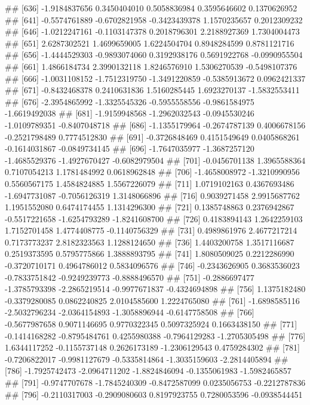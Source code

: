 \documentclass[
]{article}
\begin{document}
\begin{enumerate}[label=(\alph*)]
##  [636] -1.9184837656  0.3450404010  0.5058836984  0.3595646602  0.1370626952
##  [641] -0.5574761889 -0.6702821958 -0.3423439378  1.1570235657  0.2012309232
##  [646] -1.0212247161 -0.1103147378  0.2018796301  2.2188927369  1.7304004473
##  [651]  2.6287302521  1.4699659005  1.6224504704  0.8948284599  0.8781121716
##  [656] -1.4444529303 -0.9893074060  0.3192938176  0.5691922768 -0.0990955504
##  [661]  1.4866184734  2.3990132118  1.8246576910  1.5306270539 -0.5498107376
##  [666] -1.0031108152 -1.7512319750 -1.3491220859 -0.5385913672  0.0962421337
##  [671] -0.8432468378  0.2410631836  1.5160285445  1.6923270137 -1.5832553411
##  [676] -2.3954865992 -1.3325545326 -0.5955558556 -0.9861584975 -1.6619492038
##  [681] -1.9159948568 -1.2962032543 -0.0945530246 -1.0109789351 -0.8407048718
##  [686] -1.1355179964 -0.2674787139  0.4006678156 -0.2521798489  0.7774512830
##  [691] -0.3726848469  0.4151549649  0.0405868261 -0.1614031867 -0.0849734145
##  [696] -1.7647035977 -1.3687257120 -1.4685529376 -1.4927670427 -0.6082979504
##  [701] -0.0456701138  1.3965588364  0.7107054213  1.1781484992  0.0618962848
##  [706] -1.4658008972 -1.3210990956  0.5560567175  1.4584824885  1.5567226079
##  [711]  1.0719102163  0.4367693486 -1.6947731087 -0.7056126319  1.3148066896
##  [716]  0.9039271458  2.9915687762  1.1951552080  0.6474174455  1.1314296300
##  [721]  0.1385748863  0.2376942867 -0.5517221658 -1.6254793289 -1.8241608700
##  [726]  0.4183894143  1.2642259103  1.7152701458  1.4774408775 -0.1140756329
##  [731]  0.4989861976  2.4677217214  0.7173773237  2.8182323563  1.1288124650
##  [736]  1.4403200758  1.3517116687  0.2519373595  0.5795775866  1.3888893795
##  [741]  1.8080509025  0.2212286990 -0.3720710171  0.4964786012  0.5834096576
##  [746] -0.2343626905  0.3683536023 -0.7833751842 -0.9249239773 -0.8888496570
##  [751] -0.2886697477 -1.3785793398 -2.2865219514 -0.9977671837 -0.4324694898
##  [756]  1.1375182480 -0.3379280085  0.0862240825  2.0104585600  1.2224765080
##  [761] -1.6898585116 -2.5032796234 -2.0364154893 -1.3058896944 -0.6147758508
##  [766] -0.5677987658  0.9071146695  0.9770322345  0.5097325924  0.1663438150
##  [771] -0.1414168282 -0.8795484761  0.4255980388 -0.7964129283 -1.2705305498
##  [776]  1.6344117252 -0.1155737148  0.2626173189 -1.2306129543  0.4759284302
##  [781] -0.7206822017 -0.9981127679 -0.5335814864 -1.3035159603 -2.2814405894
##  [786] -1.7925742473 -2.0964711202 -1.8824846094 -0.1355061983 -1.5982465857
##  [791] -0.9747707678 -1.7845240309 -0.8472587099  0.0235056753 -0.2212787836
##  [796] -0.2110317003 -0.2909080603  0.8197923755  0.7280053596 -0.0938544451

\end{enumerate}
\end{document}
